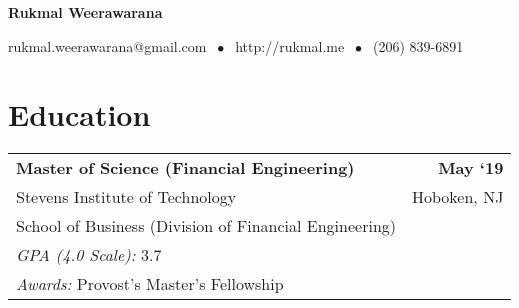 \documentclass[10pt, letterpaper]{article}
\newcommand{\highlightcolor}{RoyalBlue}
\newcommand{\tabularxwidth}{\textwidth}
\begin{document}
    \centerline{ \color{\highlightcolor} \huge \textbf{Rukmal Weerawarana}}

    \vspace{.5em}

    {\color{\highlightcolor} \centerline{rukmal.weerawarana@gmail.com $\; \bullet \;$ http://rukmal.me $\; \bullet \;$ (206) 839-6891} }

    \noindent{\rule{\linewidth}{.2em}}



    
        \section{Education}

    
        \begin{tabularx}{\tabularxwidth}{X r}
            \textbf{Master of Science (Financial Engineering)} & \textbf{
    May ‘19} \\
            \quad Stevens Institute of Technology & 
    Hoboken, 
        NJ \\
            \quad School of Business (Division of Financial Engineering) & \\
            
                \quad \textit{GPA (4.0 Scale):} 3.7 & \\
            
            
                
                    
                        \quad \textit{Awards:} 
    Provost's Master's Fellowship & \\
                    
                
            
        \end{tabularx}

        
            \vspace{.5em}
        
\end{document}
